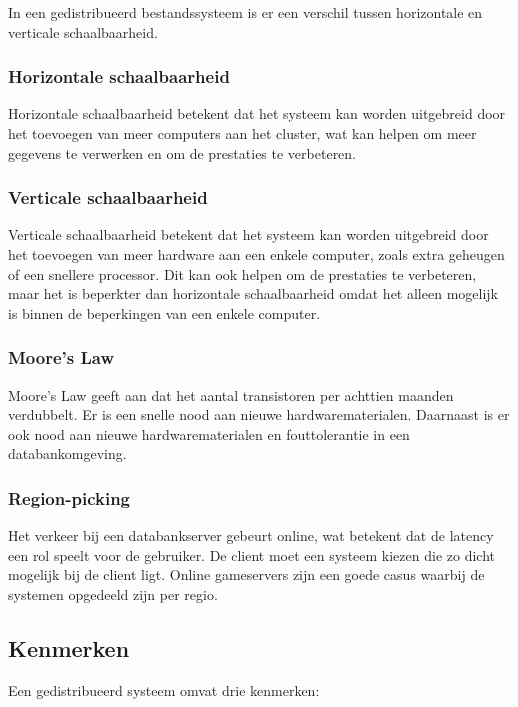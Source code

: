 \documentclass[a4paper,10pt,twoside]{report}
\begin{document}
In een gedistribueerd bestandssysteem is er een verschil tussen horizontale en verticale schaalbaarheid.

\subsubsection{Horizontale schaalbaarheid}

Horizontale schaalbaarheid betekent dat het systeem kan worden uitgebreid door het toevoegen van meer computers aan het cluster, wat kan helpen om meer gegevens te verwerken en om de prestaties te verbeteren. 

\subsubsection{Verticale schaalbaarheid}

Verticale schaalbaarheid betekent dat het systeem kan worden uitgebreid door het toevoegen van meer hardware aan een enkele computer, zoals extra geheugen of een snellere processor. Dit kan ook helpen om de prestaties te verbeteren, maar het is beperkter dan horizontale schaalbaarheid omdat het alleen mogelijk is binnen de beperkingen van een enkele computer.

\subsubsection{Moore's Law}

Moore's Law geeft aan dat het aantal transistoren per achttien maanden verdubbelt. Er is een snelle nood aan nieuwe hardwarematerialen. Daarnaast is er ook nood aan nieuwe hardwarematerialen en fouttolerantie in een databankomgeving. 

\subsubsection{Region-picking}

Het verkeer bij een databankserver gebeurt online, wat betekent dat de latency een rol speelt voor de gebruiker. De client moet een systeem kiezen die zo dicht mogelijk bij de client ligt. Online gameservers zijn een goede casus waarbij de systemen opgedeeld zijn per regio.

\subsection{Kenmerken}

Een gedistribueerd systeem omvat drie kenmerken:
\end{document}
